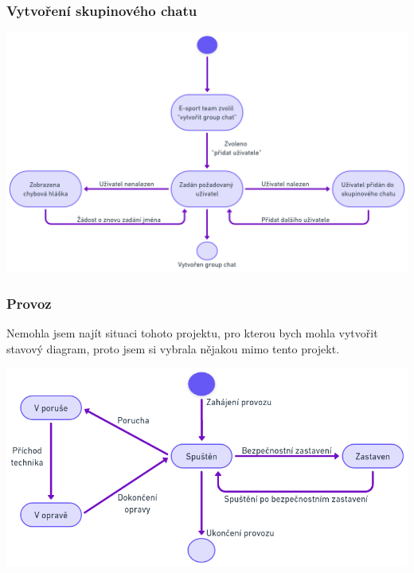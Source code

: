 \documentclass[czech,12pt,a4paper,titlepage]{article}
\begin{document}
\clearpage

\subsubsection{Vytvoření skupinového chatu}

\bigskip
\bigskip
\bigskip
\bigskip
\bigskip
\bigskip


\includegraphics[width=1\textwidth, center]{State_diagram_2.png}

\clearpage

\subsubsection{Provoz}

Nemohla jsem najít situaci tohoto projektu, pro kterou bych mohla vytvořit
stavový diagram, proto jsem si vybrala nějakou mimo tento projekt.

\bigskip
\bigskip
\bigskip
\bigskip
\bigskip
\bigskip


\includegraphics[width=1\textwidth, center]{State_diagram_3.png}

\clearpage
\end{document}
